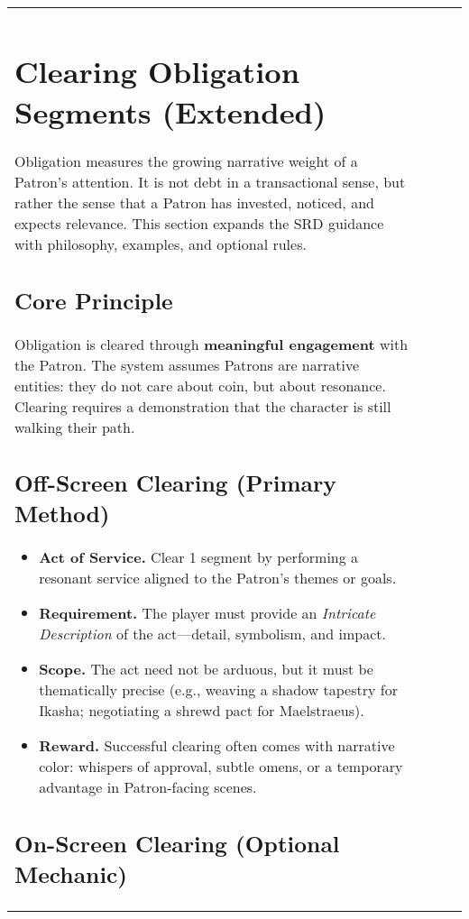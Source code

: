 \begin{longtable}{@{}p{3.3cm}p{3.3cm}p{4.6cm}p{7.2cm}@{}}

\section{Clearing Obligation Segments (Extended)}\label{sec:obligation-clearing-extended}
\index{Obligation}\index{Patrons}\index{Acts of Service}\index{Boon}\index{Focused Devotion}

Obligation measures the growing narrative weight of a Patron’s attention. It is not debt in a transactional sense, but rather the sense that a Patron has invested, noticed, and expects relevance. This section expands the SRD guidance with philosophy, examples, and optional rules.

\subsection{Core Principle}\label{subsec:obligation-principle}
Obligation is cleared through \textbf{meaningful engagement} with the Patron. The system assumes Patrons are narrative entities: they do not care about coin, but about resonance. Clearing requires a demonstration that the character is still walking their path.

\subsection{Off-Screen Clearing (Primary Method)}\label{subsec:obligation-offscreen}
\begin{itemize}
\item \textbf{Act of Service.} Clear 1 segment by performing a resonant service aligned to the Patron’s themes or goals.\index{Acts of Service}
\item \textbf{Requirement.} The player must provide an \emph{Intricate Description} of the act—detail, symbolism, and impact.
\item \textbf{Scope.} The act need not be arduous, but it must be thematically precise (e.g., weaving a shadow tapestry for Ikasha; negotiating a shrewd pact for Maelstraeus).
\item \textbf{Reward.} Successful clearing often comes with narrative color: whispers of approval, subtle omens, or a temporary advantage in Patron-facing scenes.
\end{itemize}

\subsection{On-Screen Clearing (Optional Mechanic)}\label{subsec:obligation-onscreen}

\end{longtable}
